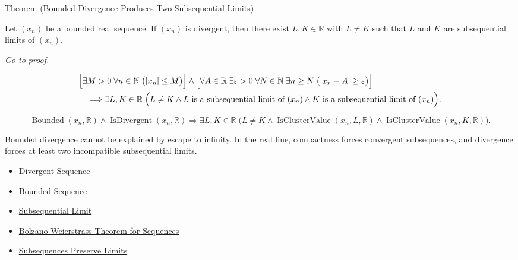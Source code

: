 \begin{theorembox}{Theorem (Bounded Divergence Produces Two Subsequential Limits)}
\begin{theorem}
\label{thm:bounded-divergence-produces-two-subsequential-limits}
Let $(x_n)$ be a bounded real sequence. If $(x_n)$ is divergent, then
there exist $L,K\in\mathbb{R}$ with $L\ne K$ such that $L$ and $K$ are
subsequential limits of $(x_n)$.

\smallskip
\noindent
\hyperref[prf:bounded-divergence-produces-two-subsequential-limits]{\textit{Go to proof.}}
\end{theorem}
\end{theorembox}

\begin{remark*}
\[
\begin{aligned}
&\Bigl[
  \exists M>0\;\forall n\in\mathbb{N}\;\bigl(|x_n|\le M\bigr)
\Bigr]
\land
\Bigl[
  \forall A\in\mathbb{R}\;\exists \varepsilon>0\;\forall N\in\mathbb{N}
  \;\exists n\ge N\;\bigl(|x_n-A|\ge\varepsilon\bigr)
\Bigr]\\
&\quad\Longrightarrow
\exists L,K\in\mathbb{R}\;
\Bigl(
  L\ne K
  \land L\text{ is a subsequential limit of }(x_n)
  \land K\text{ is a subsequential limit of }(x_n)
\Bigr).
\end{aligned}
\]
\end{remark*}

\begin{remark*}
\[
\operatorname{Bounded}(x_n,\mathbb{R})
\land
\operatorname{IsDivergent}(x_n,\mathbb{R})
\Longrightarrow
\exists L,K\in\mathbb{R}\;
\bigl(
  L\ne K
  \land \operatorname{IsClusterValue}(x_n,L,\mathbb{R})
  \land \operatorname{IsClusterValue}(x_n,K,\mathbb{R})
\bigr).
\]
\end{remark*}

\begin{remark*}[Interpretation]
Bounded divergence cannot be explained by escape to infinity. In the real
line, compactness forces convergent subsequences, and divergence forces at
least two incompatible subsequential limits.
\end{remark*}

\begin{dependencies}
\begin{itemize}
  \item \hyperref[def:divergent-sequence]{Divergent Sequence}
  \item \hyperref[def:bounded-sequence]{Bounded Sequence}
  \item \hyperref[def:subsequential-limit]{Subsequential Limit}
  \item \hyperref[thm:bolzano-weierstrass-sequences]{Bolzano-Weierstrass Theorem for Sequences}
  \item \hyperref[thm:subsequences-preserve-limits]{Subsequences Preserve Limits}
\end{itemize}
\end{dependencies}
